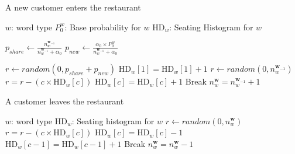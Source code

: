 \documentclass[11pt]{article}
\begin{document}
\begin{algorithm}[t]
\caption{A new customer enters the restaurant}
\begin{small}
\begin{algorithmic}[1]
\State $w$: word type
\State $P_0^w$: Base probability for $w$ 
\State $\mbox{HD}_w$: Seating Histogram for $w$

  \State $p_{share} \gets \frac{n_{w}^{\mathbf{w}_{-1}}}{n_{w}^{\mathbf{w}_{-1}} + \alpha_0}$ 
  \State $p_{new} \gets \frac{\alpha_0 \times P_0^{w}}{n_{w}^{\mathbf{w}_{-1}} + \alpha_0}$ 

  \State $r \gets random(0, p_{share} + p_{new})$ 
    \State $\mbox{HD}_w[1] = \mbox{HD}_w[1] + 1$
  \Else 
    \Statex {}
    \State $r \gets random(0, n_{w}^{\mathbf{w}_{-1}})$ 
     
      \State $r = r - (c \times \mbox{HD}_w[c])$ 
        \State $\mbox{HD}_w[c] = \mbox{HD}_w[c] + 1$
        \State Break
      \EndIf
    \EndFor
  \EndIf
  \State $n_{w}^{\mathbf{w}} = n_{w}^{\mathbf{w}_{-1}} + 1$ 
\EndProcedure
\end{algorithmic}
\end{small}
\label{alg:increment}
\end{algorithm}

\begin{algorithm}[t]
\caption{A customer leaves the restaurant}
\begin{small}
\begin{algorithmic}[1]
\State $w$: word type
\State $\mbox{HD}_w$: Seating histogram for $w$
  \State $r \gets random(0, n_{w}^{\mathbf{w}})$ 
   
    \State $r = r - (c \times \mbox{HD}_w[c])$ 
      \State $\mbox{HD}_w[c] = \mbox{HD}_w[c] - 1$
        \State $\mbox{HD}_w[c - 1] = \mbox{HD}_w[c - 1] + 1$
      \EndIf
      \State Break
    \EndIf
  \EndFor
  \State $n_{w}^{\mathbf{w}} = n_{w}^{\mathbf{w}} - 1$ 
\EndProcedure
\end{algorithmic}
\end{small}
\label{alg:decrement}
\end{algorithm}
\end{document}
